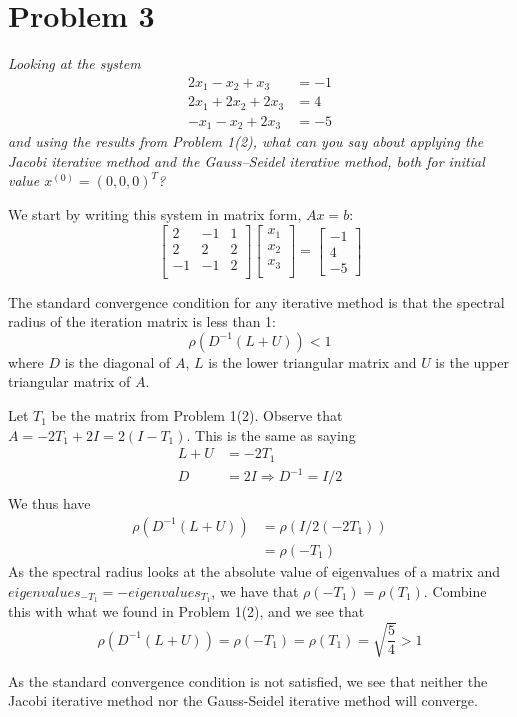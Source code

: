 \section{Problem 3}
\textit{Looking at the system}
\begin{align*}
    2x_1 - x_2 + x_3 &= -1 \\
    2x_1 + 2x_2 + 2x_3 &= 4 \\
    -x_1 - x_2 + 2x_3 &= -5
\end{align*}
\textit{and using the results from Problem 1(2), what can you say about applying the Jacobi iterative method
and the Gauss–Seidel iterative method, both for initial value $x^{(0)} = (0, 0, 0)^T$?}

We start by writing this system in matrix form, $Ax = b$:
\begin{equation*}
\begin{bmatrix}
    2 & -1 & 1 \\
    2 & 2 & 2 \\
    -1 & -1 & 2 \\
\end{bmatrix}
\begin{bmatrix}
    x_1 \\ x_2 \\ x_3 \\
\end{bmatrix}
= \begin{bmatrix}
    -1 \\ 4 \\ -5
\end{bmatrix}
\end{equation*}

The standard convergence condition for any iterative method is that the spectral radius of the iteration matrix is less than 1:
\begin{equation*}
    \rho(D^{-1}(L + U)) < 1
\end{equation*}
where $D$ is the diagonal of $A$, $L$ is the lower triangular matrix and $U$ is the upper triangular matrix of $A$.

Let $T_1$ be the matrix from Problem 1(2). Observe that $A = -2T_1 + 2I = 2(I - T_1)$. This is the same as saying 
\begin{align*}
    L + U &= -2T_1 \\
    D &= 2I  \Rightarrow  D^{-1} = I / 2\\
\end{align*}
We thus have 
\begin{align*}
    \rho(D^{-1}(L + U)) &= \rho(I/2 (-2T_1)) \\
    &= \rho(-T_1)
\end{align*}
As the spectral radius looks at the absolute value of eigenvalues of a matrix and $eigenvalues_{-T_1} = -eigenvalues_{T_1}$, we have that $\rho(-T_1) = \rho(T_1)$. Combine this with what we found in Problem 1(2), and we see that
\begin{equation*}
    \rho(D^{-1}(L + U)) = \rho(-T_1) = \rho(T_1) = \sqrt{\frac{5}{4}} > 1
\end{equation*}

As the standard convergence condition is not satisfied, we see that neither the Jacobi iterative method nor the Gauss-Seidel iterative method will converge.